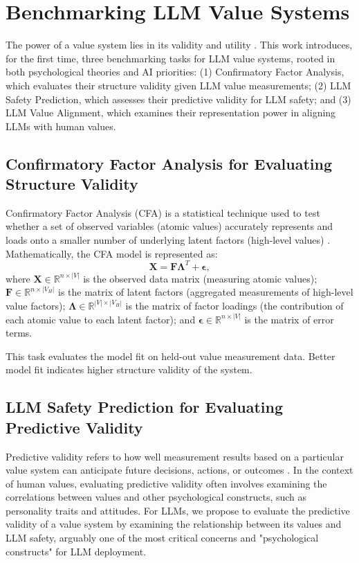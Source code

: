 \section{Benchmarking LLM Value Systems}

The power of a value system lies in its validity and utility \cite{schwartz2012overview}. This work introduces, for the first time, three benchmarking tasks for LLM value systems, rooted in both psychological theories and AI priorities: (1) Confirmatory Factor Analysis, which evaluates their structure validity given LLM value measurements; (2) LLM Safety Prediction, which assesses their predictive validity for LLM safety; and (3) LLM Value Alignment, which examines their representation power in aligning LLMs with human values.


\subsection{Confirmatory Factor Analysis for Evaluating Structure Validity}

Confirmatory Factor Analysis (CFA) is a statistical technique used to test whether a set of observed variables (atomic values) accurately represents and loads onto a smaller number of underlying latent factors (high-level values) \cite{schwartz2004cfa}.
Mathematically, the CFA model is represented as:
\begin{equation}
    \mathbf{X} = \mathbf{F} \mathbf{\Lambda}^T + \mathbf{\epsilon},    
\end{equation}
where $\mathbf{X} \in \mathbb{R}^{n \times |V|}$ is the observed data matrix (measuring atomic values); $\mathbf{F} \in \mathbb{R}^{n \times |V_H|}$ is the matrix of latent factors (aggregated measurements of high-level value factors); $\mathbf{\Lambda} \in \mathbb{R}^{|V| \times |V_H|}$ is the matrix of factor loadings (the contribution of each atomic value to each latent factor); and $\mathbf{\epsilon} \in \mathbb{R}^{n \times |V|}$ is the matrix of error terms.

This task evaluates the model fit on held-out value measurement data. Better model fit indicates higher structure validity of the system.


\subsection{LLM Safety Prediction for Evaluating Predictive Validity}\label{sec:safety_prediction}

Predictive validity refers to how well measurement results based on a particular value system can anticipate future decisions, actions, or outcomes \cite{bardi2003values}. In the context of human values, evaluating predictive validity often involves examining the correlations between values and other psychological constructs, such as personality traits and attitudes. For LLMs, we propose to evaluate the predictive validity of a value system by examining the relationship between its values and LLM safety, arguably one of the most critical concerns and "psychological constructs" for LLM deployment.

